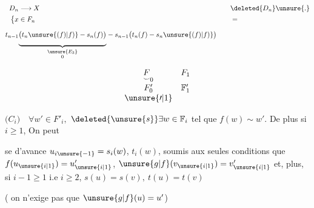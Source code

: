 

\[
\begin{aligned}
D_n&\longrightarrow X &\quad&\deleted{D_n}\unsure{.}\\
\bigl\{x&\in F_n && =\\
t_{n-1}{}&
\underset{\substack{\unsure{E_3}\hfill\\0}}{\underbrace{\vphantom{\bigg|}\bigl(t_n\unsure{(f)|f)}-s_n(f)\bigr)}}
-s_{n-1}\bigl(t_n(f)-s_n\unsure{(f)|f)}\bigr)&&
\end{aligned}
\]

\[
\begin{array}{cc}
\underset{\smile}{F}_0 & F_1\\[.6em]
F'_0 & \mathbb F'_1\\
\unsure{\prime|1}&
\end{array}
\]

\begin{flushright}
\begin{minipage}{.74\linewidth}
\(\bigl(C_i\bigr)\quad\forall w'\in F'_i,\)
 \(\deleted{\unsure{s}}\exists w\in\mathbb F_i\) tel que
\(f(w)\sim w'\). De plus si \(i\geq1\), On peut
\par\noindent{}\begin{minipage}{.89\linewidth}
se 
d'avance \(u_{i\unsure{-1}}=s_i(w)\), \(t_i(w)\),
 soumis aux seules conditions  que
\(f(u_{\unsure{i|1}})=u'_{\unsure{i|1}}\), 
\(\unsure{g|f}(v_{\unsure{i|1}})=v'_{\unsure{i|1}}\)
et,  plus, si \(i-1\geq1\) i.e \(i\geq2\), 
\(s(u)=s(v),\ t(u)=t(v)\)
\end{minipage}

( on n'exige pas que \(\unsure{g|f}(u)=u'\))
\end{minipage}
\end{flushright}


